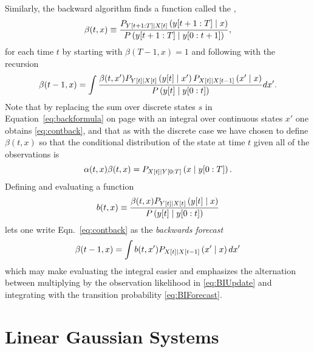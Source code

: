 Similarly, the backward algorithm finds a function called the
,
\begin{equation}
  \label{eq:contbeta}
  \beta(t,x) \equiv \frac{P_{Y[t+1:T]\mid {X}{[t]}}
  \left(y[t+1:T]\mid x \right)}{P\left(y[t+1:T]\mid y[0:t+1]
               \right)},
\end{equation}
for each time $t$ by starting with $\beta(T-1,x) = 1$ and following with
the recursion
\begin{equation}
  \label{eq:contback}
  \beta(t-1,x) = \int 
  \frac{\beta(t,x') P_{{Y}{[t]}\mid {X}{[t]}}\left({y}{[t]}\mid x' \right)
  P_{{X}{[t]}\mid {X}{[t-1]}}\left(x'\mid x \right)}
  {P\left({y}{[t]}\mid y[0:t] \right)} dx'.
\end{equation}
Note that by replacing the sum over discrete states $s$ in
Equation~\eqref{eq:backformula} on page \pageref{eq:backformula} with
an integral over continuous states $x'$ one obtains
\eqref{eq:contback}, and that as with the discrete case we have chosen
to define $\beta(t,x)$ so that the conditional distribution of the
state at time $t$ given all of the observations is
\begin{equation}
  \label{eq:contalphabeta}
  \alpha(t,x) \beta(t,x) = P_{{X}{[t]}\mid Y[0:T]}
  \left(x\mid y[0:T] \right).
\end{equation}
Defining and evaluating a \emph{} function
\begin{equation}
  \label{eq:BIUpdate}
  b(t,x) \equiv \frac{\beta(t,x)
    P_{{Y}{[t]}\mid {X}{[t]}}\left({y}{[t]}\mid x
    \right)} {P\left({y}{[t]}\mid y[0:t] \right)}
\end{equation}
lets one write Eqn.~\eqref{eq:contback} as the \emph{backwards forecast}
\begin{equation}
  \label{eq:BIForecast}
  \beta(t-1,x) = \int b(t,x') P_{{X}{[t]}\mid {X}{[t-1]}}\left(x'\mid x
  \right) dx'
\end{equation}
which may make evaluating the integral easier and emphasizes the
alternation between multiplying by the observation likelihood in
\eqref{eq:BIUpdate} and integrating with the transition probability
\eqref{eq:BIForecast}.

\section{Linear Gaussian Systems}
\label{sec:LinearGaussian}

